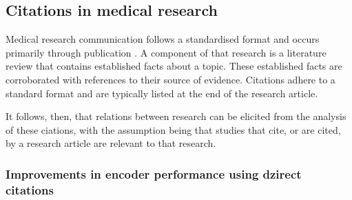 \documentclass[../main.tex]{subfiles}
\begin{document}
\subsection{Citations in medical research}

Medical research communication follows a standardised format and occurs primarily through publication \cite{BMCMedicalResearch}. A component of that research is a literature review that contains established facts about a topic. These established facts are corroborated with references to their source of evidence. Citations adhere to a standard format and are typically listed at the end of the research article.

It follows, then, that relations between research can be elicited from the analysis of these ciations, with the assumption being that studies that cite, or are cited, by a research article are relevant to that research.

\subsubsection{Improvements in encoder performance using dzirect citations}
\end{document}
